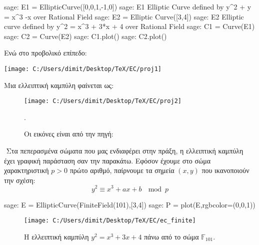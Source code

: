 \documentclass[oneside,a4paper]{article}
\begin{document}
\begin{center}
\begin{sageblock}
	sage: E1 = EllipticCurve([0,0,1,-1,0])
	sage: E1
	Elliptic Curve defined by y^2 + y = x^3 -x over Rational Field
	sage: E2 = Elliptic Curve([3,4])
	sage: E2
	Elliptic curve defined by y^2 = x^3 + 3*x + 4 over Rational Field
	sage: C1 = Curve(E1)
	sage: C2 = Curve(E2)
	sage: C1.plot()
	sage: C2.plot()
\end{sageblock}
\end{center}

\noindent Ενώ στο προβολικό επίπεδο:

\begin{center}
	\texttt{[image: C:/Users/dimit/Desktop/TeX/EC/proj1]}
\end{center}

\noindent Μια ελλειπτική καμπύλη φαίνεται ως:

\begin{figure}[H]
	\centering
	\texttt{[image: C:/Users/dimit/Desktop/TeX/EC/proj2]}
	\captionsetup{labelformat=empty}
	\caption{Οι εικόνες είναι από την πηγή: }.
\end{figure}

$ $\newline
Στα πεπερασμένα σώματα που μας ενδιαφέρει στην πράξη, η ελλειπτική καμπύλη έχει γραφική παράσταση σαν την παρακάτω. Εφόσον έχουμε στο σώμα χαρακτηριστική $p>0$ πρώτο αριθμό, παίρνουμε τα σημεία $(x,y)$ που ικανοποιούν την σχέση:
$$y^2 \equiv x^3 + ax + b \ \mod p$$
\begin{sageblock}
	sage: E = EllipticCurve(FiniteField(101),[3,4])
	sage: P = plot(E,rgbcolor=(0,0,1))
\end{sageblock}

\begin{figure}[H]
	\centering
	\captionsetup{labelformat=empty}
	\texttt{[image: C:/Users/dimit/Desktop/TeX/EC/ec\_finite]}
	\caption{Η ελλειπτική καμπύλη $y^2 = x^3 +3x + 4$ πάνω από το σώμα $\mathbb{F}_{101}$.}
\end{figure}
\end{document}

